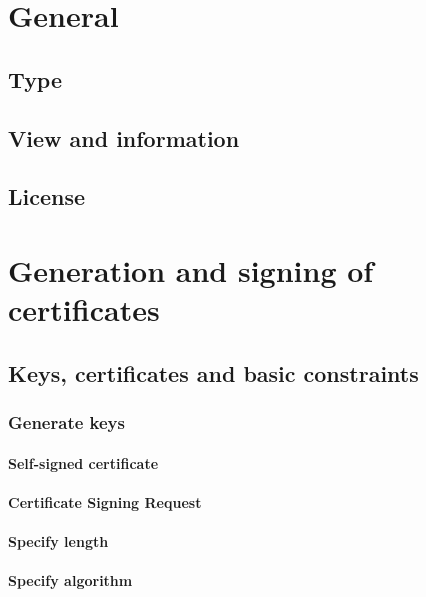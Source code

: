 \documentclass[10pt, a4paper]{report}
\begin{document}
\section{General}

  \subsection{Type}
  
  \subsection{View and information}
  
  \subsection{License}

  
\section{Generation and signing of certificates}

  \subsection{Keys, certificates and basic constraints}
  
    \subsubsection{Generate keys}
    
      \paragraph{Self-signed certificate}
      
      \paragraph{Certificate Signing Request}
      
      \paragraph{Specify length}
      
      \paragraph{Specify algorithm}
      
\end{document}
